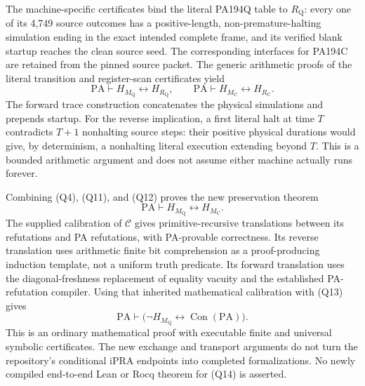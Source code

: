 The machine-specific certificates bind the literal PA194Q table to
$R_{\mathrm Q}$: every one of its 4,749 source outcomes has a
positive-length, non-premature-halting simulation ending in the exact
intended complete frame, and its verified blank startup reaches the
clean source seed. The corresponding interfaces for PA194C are
retained from the pinned source packet. The generic arithmetic proofs
of the literal transition and register-scan certificates yield
\[
 \mathrm{PA}\vdash H_{M_{\mathrm Q}}\leftrightarrow H_{R_{\mathrm Q}},
 \qquad
 \mathrm{PA}\vdash H_{M_{\mathrm C}}\leftrightarrow H_{R_{\mathrm C}}.
\tag{Q12}
\]
The forward trace construction concatenates the physical simulations
and prepends startup. For the reverse implication, a first literal
halt at time $T$ contradicts $T+1$ nonhalting source steps: their
positive physical durations would give, by determinism, a nonhalting
literal execution extending beyond $T$. This is a bounded arithmetic
argument and does not assume either machine actually runs forever.

Combining (Q4), (Q11), and (Q12) proves the new preservation theorem
\[
 \boxed{\mathrm{PA}\vdash
       H_{M_{\mathrm Q}}\leftrightarrow H_{M_{\mathrm C}}.}
\tag{Q13}
\]
The supplied calibration of $\mathcal C$ gives primitive-recursive
translations between its refutations and PA refutations, with
PA-provable correctness.
Its reverse translation uses arithmetic finite bit comprehension
as a proof-producing induction template, not a uniform truth predicate.
Its forward translation uses the diagonal-freshness replacement of
equality vacuity and the established PA-refutation compiler.
Using that inherited mathematical calibration with (Q13) gives
\[
 \boxed{\mathrm{PA}\vdash
   \bigl(\neg H_{M_{\mathrm Q}}\leftrightarrow
                         \operatorname{Con}(\mathrm{PA})\bigr).}
\tag{Q14}
\]
This is an ordinary mathematical proof with executable finite and
universal symbolic certificates. The new exchange and transport
arguments do not turn the repository's conditional iPRA endpoints
into completed formalizations. No newly compiled end-to-end Lean
or Rocq theorem for (Q14) is asserted.
